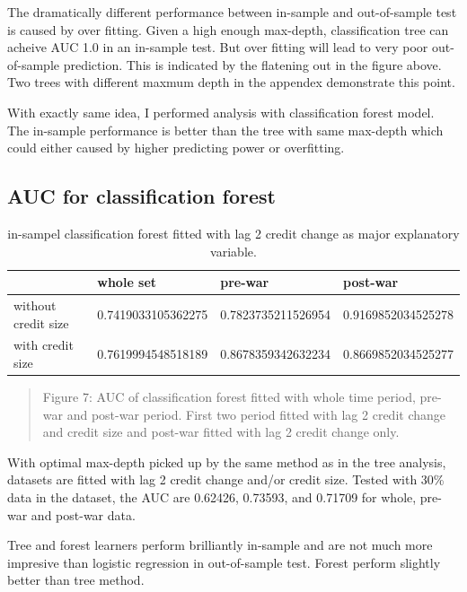 \documentclass{article}
\newcommand{\ciapdf}[1]{\vspace*{-\parskip}\begin{center}\resizebox{0.75\textwidth}{!}{\texttt{[image: \#1]}}\end{center}}
\begin{document}
The dramatically different performance between in-sample and
out-of-sample test is caused by over fitting. Given a high enough
max-depth, classification tree can acheive AUC 1.0 in an in-sample test.
But over fitting will lead to very poor out-of-sample prediction. This
is indicated by the flatening out in the figure above. Two trees with different maxmum depth in the appendex demonstrate
this point.

With exactly same idea, I performed analysis with classification forest
model. The in-sample performance is better than the tree with same
max-depth which could either caused by higher predicting power or
overfitting.

\subsection*{AUC for classification forest}


\begin{table}[H]
    \caption{in-sampel classification forest fitted with lag 2 credit change
    as major explanatory variable.}
    \begin{tabular}{|l|l|l|l|}
    \hline
                        & whole set          & pre-war            & post-war           \\ \hline
    without credit size & 0.7419033105362275 & 0.7823735211526954 & 0.9169852034525278 \\ \hline
    with credit size    & 0.7619994548518189 & 0.8678359342632234 & 0.8669852034525277 \\ \hline
    \end{tabular}
\end{table}

\ciapdf{Figure_7.pdf}
\begin{quote}
Figure 7: AUC of classification forest fitted with whole time period,
pre-war and post-war period. First two period fitted with lag 2 credit
change and credit size and post-war fitted with lag 2 credit change
only.
\end{quote}

With optimal max-depth picked up by the same method as in the tree
analysis, datasets are fitted with lag 2 credit change and/or credit
size. Tested with 30\% data in the dataset, the AUC are 0.62426,
0.73593, and 0.71709 for whole, pre-war and post-war data.

Tree and forest learners perform brilliantly in-sample and
are not much more impresive than logistic regression in out-of-sample test. Forest
perform slightly better than tree method.
\end{document}

